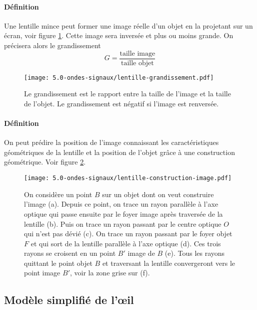 \paragraph{Définition} Une lentille mince peut former une image réelle d'un objet en la projetant sur un écran, voir figure \ref{fig:lentille-grandissement}. Cette image sera inversée et plus ou moins grande. On précisera alors le grandissement $$ G = \frac{\mbox{taille image}}{\mbox{taille objet}}$$ 

\begin{figure}[h!]
  \begin{center}
      \texttt{[image: 5.0-ondes-signaux/lentille-grandissement.pdf]}
  \end{center}
  \caption{Le grandissement est le rapport entre la taille de l'image et la taille de l'objet. Le grandissement est négatif si l'image est renversée.}
  \label{fig:lentille-grandissement}
\end{figure}

\paragraph{Définition} On peut prédire la position de l'image connaissant les caractéristiques géométriques de la lentille et la position de l'objet grâce à une construction géométrique. Voir figure \ref{fig:lentille-construction-image}.
\begin{figure}[h!]
  \begin{center}
      \texttt{[image: 5.0-ondes-signaux/lentille-construction-image.pdf]}
  \end{center}
  \caption{On considère un point $B$ sur un objet dont on veut construire l'image (a). Depuis ce point, on trace un rayon parallèle à l'axe optique qui passe ensuite par le foyer image après traversée de la lentille (b). Puis on trace un rayon passant par le centre optique $O$ qui n'est pas dévié (c). On trace un rayon passant par le foyer objet $F$ et qui sort de la lentille parallèle à l'axe optique (d). Ces trois rayons se croisent en un point $B'$ image de $B$ (e). Tous les rayons quittant le point objet $B$ et traversant la lentille convergeront vers le point image $B'$, voir la zone grise sur (f).}
  \label{fig:lentille-construction-image}
\end{figure}



\subsection{Modèle simplifié de l’œil}

